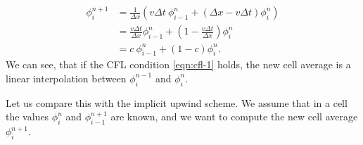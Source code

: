 \documentclass[../thesis.tex]{subfiles}
\begin{document}
\begin{equation}\label{eqn:explicit-upwind-1}
    \begin{split}
        \phi_{i}^{n+1} &=\frac{1}{\Delta x}\left(
            v\Delta t~\phi_{i-1}^{n} + \left( \Delta x - v\Delta t \right)\phi_{i}^{n}
        \right)
        \\
        &=\frac{v\Delta t}{\Delta x}\phi_{i-1}^{n}
        + \left( 1 - \frac{v\Delta t}{\Delta x} \right)\phi_{i}^{n}
        \\
        &= c~\phi_{i-1}^{n}
        + \left( 1 - c \right)\phi_{i}^{n}.
    \end{split}
\end{equation}
We can see, that if the CFL condition \eqref{eqn:cfl-1} holds, the new cell
average is a linear interpolation between \(\phi_{i}^{n-1}\) and \(\phi_{i}^{n}\).

Let us compare this with the implicit upwind scheme. We assume that in a cell the
values \(\phi_{i}^{n}\) and \(\phi_{i-1}^{n+1}\) are known, and we want to compute
the new cell average \(\phi_{i}^{n+1}\).
\end{document}
